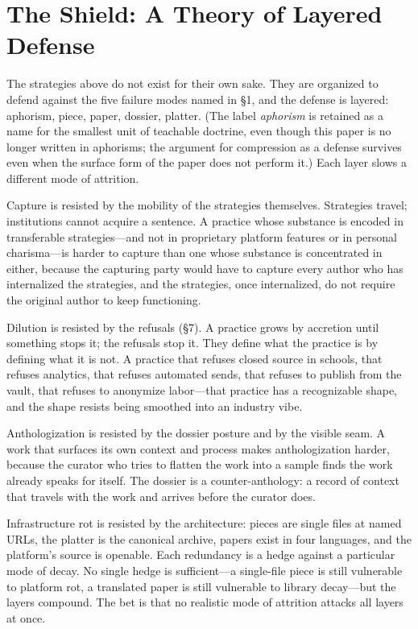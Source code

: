 \documentclass[10pt,letterpaper,twocolumn]{article}
\begin{document}
\section{The Shield: A Theory of Layered Defense}

The strategies above do not exist for their own sake. They are organized to defend against the five failure modes named in \S1, and the defense is layered: aphorism, piece, paper, dossier, platter. (The label \emph{aphorism} is retained as a name for the smallest unit of teachable doctrine, even though this paper is no longer written in aphorisms; the argument for compression as a defense survives even when the surface form of the paper does not perform it.) Each layer slows a different mode of attrition.

Capture is resisted by the mobility of the strategies themselves. Strategies travel; institutions cannot acquire a sentence. A practice whose substance is encoded in transferable strategies---and not in proprietary platform features or in personal charisma---is harder to capture than one whose substance is concentrated in either, because the capturing party would have to capture every author who has internalized the strategies, and the strategies, once internalized, do not require the original author to keep functioning.

Dilution is resisted by the refusals (\S7). A practice grows by accretion until something stops it; the refusals stop it. They define what the practice is by defining what it is not. A practice that refuses closed source in schools, that refuses analytics, that refuses automated sends, that refuses to publish from the vault, that refuses to anonymize labor---that practice has a recognizable shape, and the shape resists being smoothed into an industry vibe.

Anthologization is resisted by the dossier posture and by the visible seam. A work that surfaces its own context and process makes anthologization harder, because the curator who tries to flatten the work into a sample finds the work already speaks for itself. The dossier is a counter-anthology: a record of context that travels with the work and arrives before the curator does.

Infrastructure rot is resisted by the architecture: pieces are single files at named URLs, the platter is the canonical archive, papers exist in four languages, and the platform's source is openable. Each redundancy is a hedge against a particular mode of decay. No single hedge is sufficient---a single-file piece is still vulnerable to platform rot, a translated paper is still vulnerable to library decay---but the layers compound. The bet is that no realistic mode of attrition attacks all layers at once.
\end{document}
